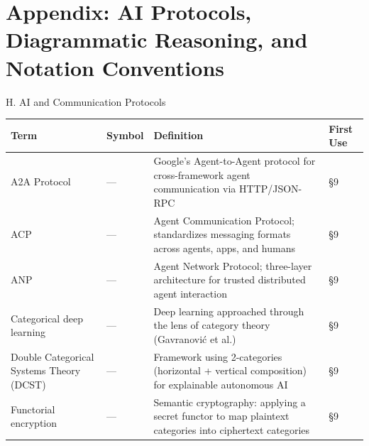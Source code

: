 \documentclass[
  ignorenonframetext,
]{beamer}
\author{\texorpdfstring{}{}}
\date{}
\newcounter{none} %
\begin{document}
\section{Appendix: AI Protocols, Diagrammatic Reasoning, and Notation
Conventions}\label{appendix-ai-protocols-diagrammatic-reasoning-and-notation-conventions}

\begin{frame}{H. AI and Communication Protocols}
\protect{}\label{h.-ai-and-communication-protocols}
{\def\LTcaptype{none} %
\begin{longtable}[]{@{}
  >{\raggedright\arraybackslash}p{}
  >{\centering\arraybackslash}p{}
  >{\raggedright\arraybackslash}p{}
  >{\centering\arraybackslash}p{}@{}}
\toprule\noalign{}
\begin{minipage}[b]{\linewidth}\raggedright
Term
\end{minipage} & \begin{minipage}[b]{\linewidth}\centering
Symbol
\end{minipage} & \begin{minipage}[b]{\linewidth}\raggedright
Definition
\end{minipage} & \begin{minipage}[b]{\linewidth}\centering
First Use
\end{minipage} \\
\midrule\noalign{}
\endhead
A2A Protocol & --- & Google's Agent-to-Agent protocol for
cross-framework agent communication via HTTP/JSON-RPC & §9 \\
ACP & --- & Agent Communication Protocol; standardizes messaging formats
across agents, apps, and humans & §9 \\
ANP & --- & Agent Network Protocol; three-layer architecture for trusted
distributed agent interaction & §9 \\
Categorical deep learning & --- & Deep learning approached through the
lens of category theory (Gavranović et al.) & §9 \\
Double Categorical Systems Theory (DCST) & --- & Framework using
2-categories (horizontal + vertical composition) for explainable
autonomous AI & §9 \\
Functorial encryption & --- & Semantic cryptography: applying a secret
functor to map plaintext categories into ciphertext categories & §9 \\

\end{longtable}}
\end{frame}
\end{document}
